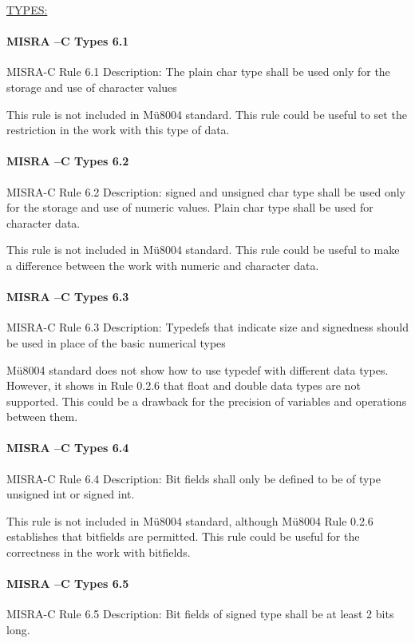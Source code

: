 \begin{center}
\textsc{\underline{TYPES:}}
\end{center}

\paragraph{MISRA –C Types 6.1}
MISRA-C Rule 6.1 Description: The plain char type shall be used only for the storage and use of character values

This rule is not included in Mü8004 standard. This rule could be useful to set the restriction in the work with this type of data.

\paragraph{MISRA –C Types 6.2}
MISRA-C Rule 6.2 Description: signed and unsigned char type shall be used only for the storage and use of numeric values. Plain char type shall be used for character data.

This rule is not included in Mü8004 standard. This rule could be useful to make a difference between the work with numeric and character data.

\paragraph{MISRA –C Types 6.3}
MISRA-C Rule 6.3 Description: Typedefs that indicate size and signedness should be used in place of the basic numerical types

Mü8004 standard does not show how to use typedef with different data types. However, it shows in Rule 0.2.6 that float and double data types are not supported. This could be a drawback for the precision of variables and operations between them.

\paragraph{MISRA –C Types 6.4}
MISRA-C Rule 6.4 Description: Bit fields shall only be defined to be of type unsigned int or signed int.

This rule is not included in Mü8004 standard, although Mü8004 Rule 0.2.6 establishes that bitfields are permitted. This rule could be useful for the correctness in the work with bitfields.

\paragraph{MISRA –C Types 6.5}
MISRA-C Rule 6.5 Description: Bit fields of signed type shall be at least 2 bits long.

